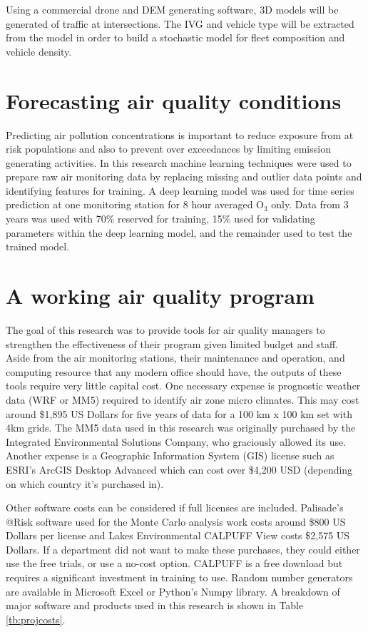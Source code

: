 Using a commercial drone and DEM generating software, 3D models will be generated of traffic at intersections. The IVG and vehicle type will be extracted from the model in order to build a stochastic model for fleet composition and vehicle density. 

\section{Forecasting air quality conditions}

Predicting air pollution concentrations is important to reduce exposure from at risk populations and also to prevent over exceedances by limiting emission generating activities. In this research machine learning techniques were used to prepare raw air monitoring data by replacing missing and outlier data points and identifying features for training. A deep learning model was used for time series prediction at one monitoring station for 8 hour averaged O$_{3}$ only.  Data from 3 years was used with 70\% reserved for training, 15\% used for validating parameters within the deep learning model, and the remainder used to test the trained model.

\section{A working air quality program}

The goal of this research was to provide tools for air quality managers to strengthen the effectiveness of their program given limited budget and staff. Aside from the air monitoring stations, their maintenance and operation, and computing resource that any modern office should have, the outputs of these tools require very little capital cost. One necessary expense is prognostic weather data (WRF or MM5) required to identify air zone micro climates. This may cost around \$1,895 US Dollars for five years of data for a 100 km x 100 km set with 4km grids. The MM5 data used in this research was originally purchased by the Integrated Environmental Solutions Company, who graciously allowed its use. Another expense is a Geographic Information System (GIS) license such as ESRI's ArcGIS Desktop Advanced which can cost over \$4,200 USD (depending on which country it's purchased in).

Other software costs can be considered if full licenses are included. Palisade's @Risk software used for the Monte Carlo analysis work costs around \$800 US Dollars per license and Lakes Environmental CALPUFF View costs \$2,575 US Dollars. If a department did not want to make these purchases, they could either use the free trials, or use a no-cost option. CALPUFF is a free download but requires a significant investment in training to use. Random number generators are available in Microsoft Excel or Python's Numpy library. A breakdown of major software and products used in this research is shown in Table \ref{tb:projcosts}.

